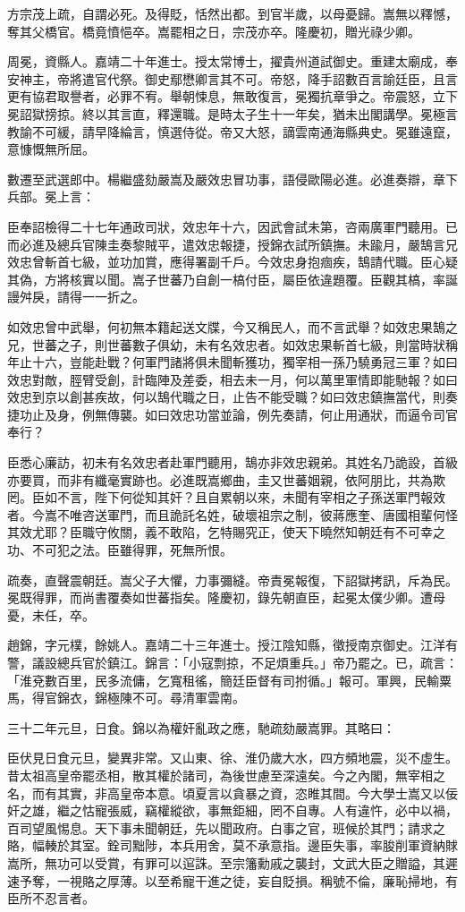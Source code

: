 \begin{pinyinscope}
方宗茂上疏，自謂必死。及得貶，恬然出都。到官半歲，以母憂歸。嵩無以釋憾，奪其父橋官。橋竟憤悒卒。嵩罷相之日，宗茂亦卒。隆慶初，贈光祿少卿。

周冕，資縣人。嘉靖二十年進士。授太常博士，擢貴州道試御史。重建太廟成，奉安神主，帝將遣官代祭。御史鄢懋卿言其不可。帝怒，降手詔數百言諭廷臣，且言更有協君取譽者，必罪不宥。舉朝悚息，無敢復言，冕獨抗章爭之。帝震怒，立下冕詔獄搒掠。終以其言直，釋還職。是時太子生十一年矣，猶未出閣講學。冕極言教諭不可緩，請早降綸言，慎選侍從。帝又大怒，謫雲南通海縣典史。冕雖遠竄，意慷慨無所屈。

數遷至武選郎中。楊繼盛劾嚴嵩及嚴效忠冒功事，語侵歐陽必進。必進奏辯，章下兵部。冕上言：

臣奉詔檢得二十七年通政司狀，效忠年十六，因武會試未第，咨兩廣軍門聽用。已而必進及總兵官陳圭奏黎賊平，遣效忠報捷，授錦衣試所鎮撫。未踰月，嚴鵠言兄效忠曾斬首七級，並功加賞，應得署副千戶。今效忠身抱痼疾，鵠請代職。臣心疑其偽，方將核實以聞。嵩子世蕃乃自創一槁付臣，屬臣依違題覆。臣觀其槁，率誕謾舛戾，請得一一折之。

如效忠曾中武舉，何初無本籍起送文牒，今又稱民人，而不言武舉？如效忠果鵠之兄，世蕃之子，則世蕃數子俱幼，未有名效忠者。如效忠果斬首七級，則當時狀稱年止十六，豈能赴戰？何軍門諸將俱未聞斬獲功，獨宰相一孫乃驍勇冠三軍？如曰效忠對敵，脛臂受創，計臨陣及差委，相去未一月，何以萬里軍情即能馳報？如曰效忠到京以創甚疾故，何以鵠代職之日，止告不能受職？如曰效忠鎮撫當代，則奏捷功止及身，例無傳襲。如曰效忠功當並論，例先奏請，何止用通狀，而逼令司官奉行？

臣悉心廉訪，初未有名效忠者赴軍門聽用，鵠亦非效忠親弟。其姓名乃詭設，首級亦要買，而非有纖毫實跡也。必進既嵩鄉曲，圭又世蕃姻親，依阿朋比，共為欺罔。臣如不言，陛下何從知其奸？且自累朝以來，未聞有宰相之子孫送軍門報效者。今嵩不唯咨送軍門，而且詭託名姓，破壞祖宗之制，彼蔣應奎、唐國相輩何怪其效尤耶？臣職守攸關，義不敢陷，乞特賜究正，使天下曉然知朝廷有不可幸之功、不可犯之法。臣雖得罪，死無所恨。

疏奏，直聲震朝廷。嵩父子大懼，力事彌縫。帝責冕報復，下詔獄拷訊，斥為民。冕既得罪，而尚書覆奏如世蕃指矣。隆慶初，錄先朝直臣，起冕太僕少卿。遭母憂，未任，卒。

趙錦，字元樸，餘姚人。嘉靖二十三年進士。授江陰知縣，徵授南京御史。江洋有警，議設總兵官於鎮江。錦言：「小寇剽掠，不足煩重兵。」帝乃罷之。已，疏言：「淮兗數百里，民多流傭，乞寬租徭，簡廷臣督有司拊循。」報可。軍興，民輸粟馬，得官錦衣，錦極陳不可。尋清軍雲南。

三十二年元旦，日食。錦以為權奸亂政之應，馳疏劾嚴嵩罪。其略曰：

臣伏見日食元旦，變異非常。又山東、徐、淮仍歲大水，四方頻地震，災不虛生。昔太祖高皇帝罷丞相，散其權於諸司，為後世慮至深遠矣。今之內閣，無宰相之名，而有其實，非高皇帝本意。頃夏言以貪暴之資，恣睢其間。今大學士嵩又以佞奸之雄，繼之怙寵張威，竊權縱欲，事無鉅細，罔不自專。人有違忤，必中以禍，百司望風惕息。天下事未聞朝廷，先以聞政府。白事之官，班候於其門；請求之賂，幅輳於其室。銓司黜陟，本兵用舍，莫不承意指。邊臣失事，率朘削軍資納賕嵩所，無功可以受賞，有罪可以逭誅。至宗籓勳戚之襲封，文武大臣之贈謚，其遲速予奪，一視賂之厚薄。以至希寵干進之徒，妄自貶損。稱號不倫，廉恥掃地，有臣所不忍言者。


\end{pinyinscope}
